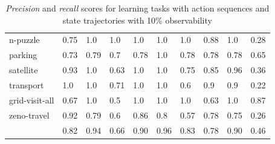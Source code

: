 \begin{table}[hbt!]
\begin{center}
\begin{tabular}{l|l|l|l|l|l|l||l|l|l|}
				n-puzzle & 0.75 & 1.0 & 1.0 & 1.0 & 1.0 & 1.0 & 0.88 & 1.0& 0.28 \\ %
				parking & 0.73 & 0.79 & 0.7 & 0.78 & 1.0 & 0.78 & 0.78 & 0.78& 0.65 \\ %
				satellite & 0.93 & 1.0 & 0.63 & 1.0 & 1.0 & 0.75 & 0.85 & 0.96& 0.36 \\ %
				transport & 1.0 & 1.0 & 0.71 & 1.0 & 1.0 & 0.6 & 0.9 & 0.9& 0.22 \\ %
				grid-visit-all & 0.67 & 1.0 & 0.5 & 1.0 & 1.0 & 1.0 & 0.63 & 1.0& 0.87 \\ %
				zeno-travel & 0.92 & 0.79 & 0.6 & 0.86 & 0.8 & 0.57 & 0.78 & 0.75& 0.26 \\ %
				\hline
				\bf & 0.82 & 0.94 & 0.66 & 0.90 & 0.96 & 0.83 & 0.78 & 0.90 & 0.46 \\
			\end{tabular}
			
		\end{center}
	\caption{\small {\em Precision} and {\em recall} scores for learning tasks with \FO action sequences and \PO state trajectories with 10\% observability}
	\label{tab:results_minimum_100_10}
\end{table}



